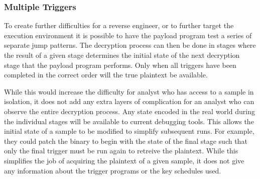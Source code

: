 \subsubsection{Multiple Triggers}
To create further difficulties for a reverse engineer, or to further target
the execution environment it is possible
to have the payload program test a series of separate jump patterns. The decryption
process can then be done in stages where the result of a given stage determines 
the initial state of the next decryption stage that the payload program 
performs. Only when all triggers have been completed in the correct order will
the true plaintext be available. 

While this would increase the difficulty for analyst  who has access
to a sample in isolation, it  does not add any extra layers of complication 
for an analyst who can observe the entire decryption process. Any state 
encoded in the real world during the individual stages will be available to current 
debugging tools. This allows the initial state of a sample to be modified
to simplify subsequent runs. For example, they could patch the 
binary to begin with the state of the final stage such that only the final 
trigger must be run again to retreive the plaintext. While this simplifies the 
job of acquiring the plaintext of a given \speculake sample, it does not give any 
information about the trigger programs or the key schedules used. 


